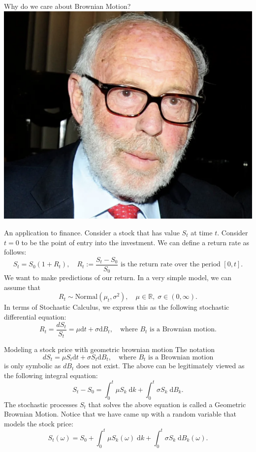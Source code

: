 \documentclass{beamer}%
\numberwithin{equation}{section}
\newcommand{\R}{\mathbb{R}}
\newcommand{\ud}{\ensuremath{\mathrm{d} }}
\begin{document}
\begin{frame}{Why do we care about Brownian Motion?}
	\centering
	\includegraphics[scale=.3]{simmons.png}
\end{frame}

\begin{frame}{An application to finance.}
	Consider a stock that has value $S_t$ at time $t$. Consider $t=0$ to be the point of entry into the investment. We can define a return rate as follows:
		\[
			S_t = S_0(1 + R_t ), \quad R_t := \frac{S_t - S_0}{S_0} \text{ is the return rate over the period $[0,t]$} .
		\]
	We want to make predictions of our return. In a very simple model, we can assume that 
		\[
			R_t \sim \text{Normal}(\mu_t, \sigma^2), \quad \mu \in \R,\; \sigma \in (0,\infty).
		\]
	In terms of Stochastic Calculus, we express this as the following stochastic differential equation:
		\[
		R_t =	\frac{dS_t}{S_t} = \mu \ud t + \sigma \ud B_t, \quad \text{where } B_t \text{ is a Brownian motion.}
		\]
	
\end{frame}

\begin{frame}{Modeling a stock price with geometric brownian motion}
The notation 
	\[
		dS_t = \mu S_t \ud t + \sigma S_t \ud B_t, \quad \text{where } B_t \text{ is a Brownian motion}
	\]
is only symbolic as $dB_t$ does not exist. The above can be legitimately viewed as the following integral equation:
	\[
		S_t - S_0 = \int_0^t \mu S_k \; \ud k + \int_0^t \sigma S_k \; \ud B_k.
	\] 		
The stochastic processes $S_t$ that solves the above equation is called a Geometric Brownian Motion. 	Notice that we have came up with a random variable that models the stock price:
	\[
		S_t(\omega)  = S_0 +  \int_0^t \mu S_k(\omega) \; \ud k + \int_0^t \sigma S_k \; \ud B_k(\omega).
	\]
\end{frame}
\end{document}
